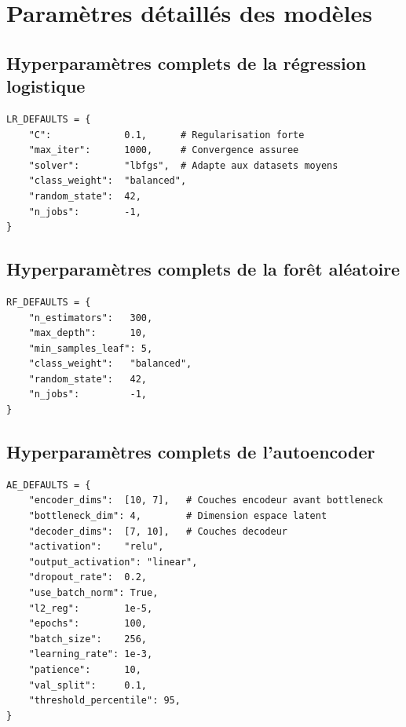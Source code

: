 \documentclass[12pt,a4paper,twoside]{report}
\begin{document}
\appendix

\chapter{Paramètres détaillés des modèles}

\section{Hyperparamètres complets de la régression logistique}

\begin{lstlisting}[caption={Hyperparamètres LR (src/models/ml\_models.py)},label={lst:lr_params}]
LR_DEFAULTS = {
    "C":             0.1,      # Regularisation forte
    "max_iter":      1000,     # Convergence assuree
    "solver":        "lbfgs",  # Adapte aux datasets moyens
    "class_weight":  "balanced",
    "random_state":  42,
    "n_jobs":        -1,
}
\end{lstlisting}

\section{Hyperparamètres complets de la forêt aléatoire}

\begin{lstlisting}[caption={Hyperparamètres RF (src/models/ml\_models.py)},label={lst:rf_params}]
RF_DEFAULTS = {
    "n_estimators":   300,
    "max_depth":      10,
    "min_samples_leaf": 5,
    "class_weight":   "balanced",
    "random_state":   42,
    "n_jobs":         -1,
}
\end{lstlisting}

\section{Hyperparamètres complets de l'autoencoder}

\begin{lstlisting}[caption={Hyperparamètres AE (src/models/autoencoder.py)},label={lst:ae_params}]
AE_DEFAULTS = {
    "encoder_dims":  [10, 7],   # Couches encodeur avant bottleneck
    "bottleneck_dim": 4,        # Dimension espace latent
    "decoder_dims":  [7, 10],   # Couches decodeur
    "activation":    "relu",
    "output_activation": "linear",
    "dropout_rate":  0.2,
    "use_batch_norm": True,
    "l2_reg":        1e-5,
    "epochs":        100,
    "batch_size":    256,
    "learning_rate": 1e-3,
    "patience":      10,
    "val_split":     0.1,
    "threshold_percentile": 95,
}
\end{lstlisting}
\end{document}

